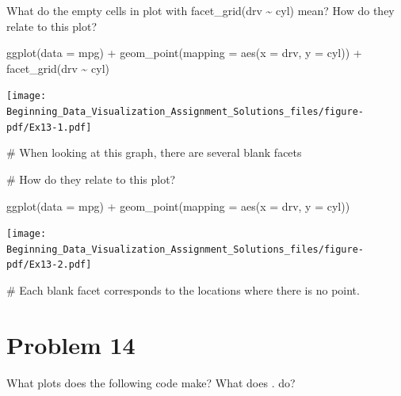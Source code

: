 \documentclass[
  letterpaper,
  DIV=11,
  numbers=noendperiod]{scrreprt}
\newenvironment{Shaded}{\begin{snugshade}}{\end{snugshade}}
\newcommand{\AttributeTok}[1]{\textcolor[rgb]{0.40,0.45,0.13}{#1}}
\newcommand{\CommentTok}[1]{\textcolor[rgb]{0.37,0.37,0.37}{#1}}
\newcommand{\FunctionTok}[1]{\textcolor[rgb]{0.28,0.35,0.67}{#1}}
\newcommand{\NormalTok}[1]{\textcolor[rgb]{0.00,0.23,0.31}{#1}}
\newcommand{\SpecialCharTok}[1]{\textcolor[rgb]{0.37,0.37,0.37}{#1}}
\begin{document}

What do the empty cells in plot with facet\_grid(drv \textasciitilde{}
cyl) mean? How do they relate to this plot?

\begin{Shaded}
\begin{Highlighting}[]
\FunctionTok{ggplot}\NormalTok{(}\AttributeTok{data =}\NormalTok{ mpg) }\SpecialCharTok{+} 
  \FunctionTok{geom\_point}\NormalTok{(}\AttributeTok{mapping =} \FunctionTok{aes}\NormalTok{(}\AttributeTok{x =}\NormalTok{ drv, }\AttributeTok{y =}\NormalTok{ cyl)) }\SpecialCharTok{+}
  \FunctionTok{facet\_grid}\NormalTok{(drv }\SpecialCharTok{\textasciitilde{}}\NormalTok{ cyl)}
\end{Highlighting}
\end{Shaded}

\texttt{[image: Beginning\_Data\_Visualization\_Assignment\_Solutions\_files/figure-pdf/Ex13-1.pdf]}

\begin{Shaded}
\begin{Highlighting}[]
\CommentTok{\# When looking at this graph, there are several blank facets}

\CommentTok{\# How do they relate to this plot?}

\FunctionTok{ggplot}\NormalTok{(}\AttributeTok{data =}\NormalTok{ mpg) }\SpecialCharTok{+} 
  \FunctionTok{geom\_point}\NormalTok{(}\AttributeTok{mapping =} \FunctionTok{aes}\NormalTok{(}\AttributeTok{x =}\NormalTok{ drv, }\AttributeTok{y =}\NormalTok{ cyl))}
\end{Highlighting}
\end{Shaded}

\texttt{[image: Beginning\_Data\_Visualization\_Assignment\_Solutions\_files/figure-pdf/Ex13-2.pdf]}

\begin{Shaded}
\begin{Highlighting}[]
\CommentTok{\# Each blank facet corresponds to the locations where there is no point.}
\end{Highlighting}
\end{Shaded}

\section*{Problem 14}\label{problem-14-3}


What plots does the following code make? What does . do?
\end{document}
